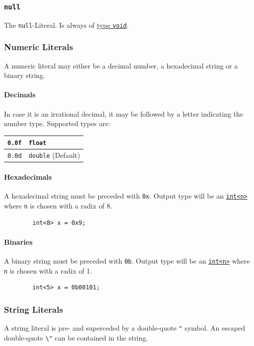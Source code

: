 \documentclass{docs}
\begin{document}
    \subsubsection{\texttt{null}}
    The \texttt{null}-Literal. Is always of \hyperref[typeVoid]{type \texttt{void}}.
    
    \label{litNum}
    \subsubsection{Numeric Literals}
    A numeric literal may either be a decimal number, a hexadecimal string or a binary string. \\
    \paragraph*{Decimals}
    In case it is an irrational decimal, it may be followed by a letter indicating the number type. Supported types are:
    \begin{center}
    \begin{tabular}{c|l}
        \texttt{0.0f} & \texttt{float} \\
        \hline
        \texttt{0.0d} & \texttt{double} (Default)
    \end{tabular}
    \end{center}
    \paragraph*{Hexadecimals}
    A hexadecimal string must be preceded with \texttt{0x}. Output type will be an \hyperref[typeInt]{\texttt{int<n>}} where \texttt{n} is chosen with a radix of 8.
    \begin{verbatim}
        int<8> x = 0x9;
    \end{verbatim}
    \paragraph*{Binaries}
    A binary string must be preceded with \texttt{0b}. Output type will be an \hyperref[typeInt]{\texttt{int<n>}} where \texttt{n} is chosen with a radix of 1.
    \begin{verbatim}
        int<5> x = 0b00101;
    \end{verbatim}
    
    \label{litStr}
    \subsubsection{String Literals}
    A string literal is pre- and superceded by a double-quote \texttt{"} symbol.
    An escaped double-quote \texttt{\textbackslash"} can be contained in the string.
    
\end{document}

